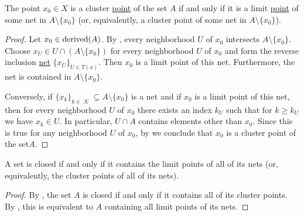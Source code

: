 \begin{proposition}\label{thm:cluster_point_of_set_iff_limit_point_of_net}
  The point \( x_0 \in X \) is a cluster \hyperref[def:topological_derived_set/cluster_point]{point} of the set \( A \) if and only if it is a limit \hyperref[def:net_convergence/cluster]{point} of some net in \( A \setminus \{ x_0 \} \) (or, equivalently, a cluster point of some net in \( A \setminus \{ x_0 \} \)).
\end{proposition}
\begin{proof}
  \SufficiencySubProof Let \( x_0 \in \operatorname{derived}(A) \). By , every neighborhood \( U \) of \( x_0 \) intersects \( A \setminus \{ x_0 \} \). Choose \( x_U \in U \cap (A \setminus \{ x_0 \}) \) for every neighborhood \( U \) of \( x_0 \) and form the reverse inclusion \hyperref[ex:reverse_inclusion_net]{net} \( \{ x_U \}_{U \in T(x)} \). Then \( x_0 \) is a limit point of this net. Furthermore, the net is contained in \( A \setminus \{ x_0 \} \).

  \NecessitySubProof Conversely, if \( \{ x_k \}_{k \in \mscrK} \subseteq A \setminus \{ x_0 \} \) is a net and if \( x_0 \) is a limit point of this net, then for every neighborhood \( U \) of \( x_0 \) there exists an index \( k_U \) such that for \( k \geq k_U \) we have \(  x_k \in U \). In particular, \( U \cap A \) contains elements other than \( x_0 \). Since this is true for any neighborhood \( U \) of \( x_0 \), by  we conclude that \( x_0 \) is a cluster point of the set\( A \).
\end{proof}

\begin{corollary}\label{thm:closed_iff_contains_all_net_cluster_points}
  A set is closed if and only if it contains the limit points of all of its nets (or, equivalently, the cluster points of all of its nets).
\end{corollary}
\begin{proof}
  By , the set \( A \) is closed if and only if it contains all of its cluster points. By , this is equivalent to \( A \) containing all limit points of its nets.
\end{proof}

